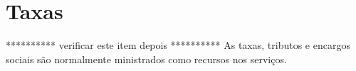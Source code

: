 \chapter{Taxas}

********** verificar este item depois **********
As taxas, tributos e encargos sociais são normalmente ministrados como recursos nos serviços.